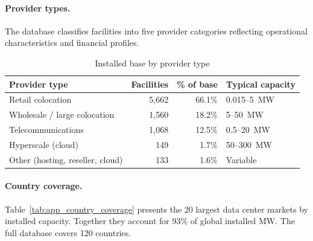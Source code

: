 \paragraph{Provider types.} The database classifies facilities into five provider
categories reflecting operational characteristics and financial profiles.

\begin{table}[H]
\centering
\small
\caption{Installed base by provider type}
\label{tab:app_provider}
\begin{tabular}{@{}lrrl@{}}
\toprule
\textbf{Provider type} & \textbf{Facilities} & \textbf{\% of base} & \textbf{Typical capacity} \\
\midrule
Retail colocation & 5{,}662 & 66.1\% & 0.015--5~MW \\
Wholesale / large colocation & 1{,}560 & 18.2\% & 5--50~MW \\
Telecommunications & 1{,}068 & 12.5\% & 0.5--20~MW \\
Hyperscale (cloud) & 149 & 1.7\% & 50--300~MW \\
Other (hosting, reseller, cloud) & 133 & 1.6\% & Variable \\
\bottomrule
\end{tabular}
\end{table}

\paragraph{Country coverage.} Table~\ref{tab:app_country_coverage} presents the 20
largest data center markets by installed capacity. Together they account for 93\% of
global installed MW. The full database covers 120 countries.

